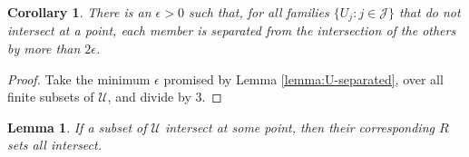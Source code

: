 \documentclass{article}
\newtheorem{lemma}{Lemma}
\newtheorem{corollary}{Corollary}
\begin{document}
\begin{corollary} \label{cor:separated-small-enough}
  There is an $\epsilon > 0$ such that, for all families $\{U_j : j \in \mathcal{J}\}$ that do not intersect at a point, each member is separated from the intersection of the others by more than $2\epsilon$.
\end{corollary}
\begin{proof}
  Take the minimum $\epsilon$ promised by Lemma \ref{lemma:U-separated}, over all finite subsets of $\mathcal{U}$, and divide by $3$.
\end{proof}

\begin{lemma}
  If a subset of $\mathcal{U}$ intersect at some point, then their corresponding $R$ sets all intersect.
\end{lemma}
\end{document}
